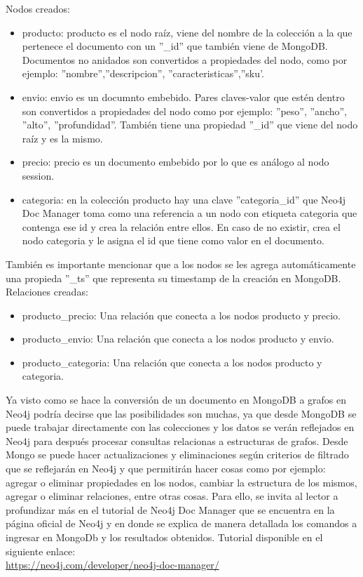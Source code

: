 \documentclass[conference]{IEEEtran}
\begin{document}
Nodos creados:\\
\begin{itemize}
\item producto: producto es el nodo ra\'iz, viene del nombre de la colecci\'on a la que pertenece el documento con un  ''\_id'' que tambi\'en viene de MongoDB. Documentos no anidados son convertidos a propiedades del nodo, como por ejemplo: ''nombre'',''descripcion'', ''caracteristicas'',''sku'.
\item envio: envio es un documnto embebido. Pares claves-valor que est\'en dentro son convertidos a propiedades del nodo como por ejemplo: ''peso'', ''ancho'', ''alto'', ''profundidad''. Tambi\'en tiene una propiedad ''\_id'' que viene del nodo ra\'iz y es la mismo.
\item precio: precio es un documento embebido por lo que es análogo al nodo session.
\item categoria: en la colecci\'on producto hay una clave ''categoria\_id'' que Neo4j Doc Manager toma como una referencia a un nodo con etiqueta categoria que contenga ese id y crea la relaci\'on entre ellos. En caso de no existir, crea el nodo categoria y le asigna el id que tiene como valor en el documento.
\end{itemize}
También es importante mencionar que a los nodos se les agrega autom\'aticamente una propieda ''\_ts'' que representa su timestamp de la creaci\'on en MongoDB.\\

Relaciones creadas:\\

\begin{itemize}
\item producto\_precio: Una relaci\'on que conecta a los nodos producto y precio.
\item producto\_envio: Una relaci\'on que conecta a los nodos producto y envio.
\item producto\_categoria: Una relaci\'on que conecta a los nodos producto y categoria.\\
\end{itemize}

Ya visto como se hace la conversi\'on de un documento en MongoDB a grafos en Neo4j podr\'ia decirse que las posibilidades son muchas, ya que desde MongoDB se puede trabajar directamente con las colecciones y los datos se ver\'an reflejados en Neo4j para despu\'es procesar consultas relacionas a estructuras de grafos. Desde Mongo se puede hacer actualizaciones y eliminaciones  seg\'un criterios de filtrado que se reflejar\'an en Neo4j y que permitir\'an hacer cosas como por ejemplo: agregar o eliminar propiedades en los nodos, cambiar la estructura de los mismos, agregar o eliminar relaciones, entre otras cosas. Para ello, se invita al lector a profundizar m\'as en el tutorial de Neo4j Doc Manager que se encuentra en la p\'agina oficial de Neo4j  y en donde se explica de manera detallada los comandos a ingresar en MongoDb y los resultados obtenidos. Tutorial disponible en el siguiente enlace:\\
\url{https://neo4j.com/developer/neo4j-doc-manager/}
\end{document}
